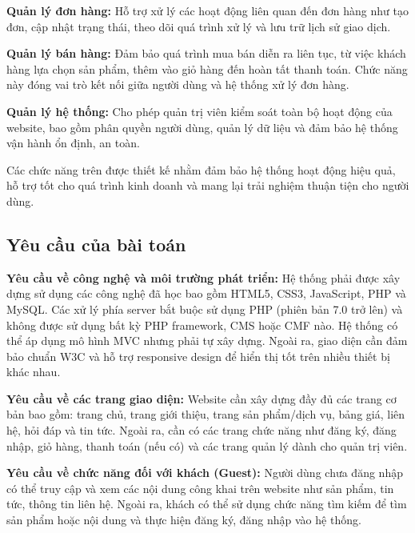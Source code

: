 \documentclass[pt = 12,a4paper]{article}
\begin{document}
\hspace{0.4cm} \textbf{Quản lý đơn hàng:} Hỗ trợ xử lý các hoạt động liên quan đến đơn hàng như tạo đơn, cập nhật trạng thái, theo dõi quá trình xử lý và lưu trữ lịch sử giao dịch.

\hspace{0.4cm} \textbf{Quản lý bán hàng:} Đảm bảo quá trình mua bán diễn ra liên tục, từ việc khách hàng lựa chọn sản phẩm, thêm vào giỏ hàng đến hoàn tất thanh toán. Chức năng này đóng vai trò kết nối giữa người dùng và hệ thống xử lý đơn hàng.

\hspace{0.4cm} \textbf{Quản lý hệ thống:} Cho phép quản trị viên kiểm soát toàn bộ hoạt động của website, bao gồm phân quyền người dùng, quản lý dữ liệu và đảm bảo hệ thống vận hành ổn định, an toàn.

\hspace{0.4cm} Các chức năng trên được thiết kế nhằm đảm bảo hệ thống hoạt động hiệu quả, hỗ trợ tốt cho quá trình kinh doanh và mang lại trải nghiệm thuận tiện cho người dùng.

\subsection{Yêu cầu của bài toán}

\hspace{0.4cm} \textbf{Yêu cầu về công nghệ và môi trường phát triển:} Hệ thống phải được xây dựng sử dụng các công nghệ đã học bao gồm HTML5, CSS3, JavaScript, PHP và MySQL. Các xử lý phía server bắt buộc sử dụng PHP (phiên bản 7.0 trở lên) và không được sử dụng bất kỳ PHP framework, CMS hoặc CMF nào. Hệ thống có thể áp dụng mô hình MVC nhưng phải tự xây dựng. Ngoài ra, giao diện cần đảm bảo chuẩn W3C và hỗ trợ responsive design để hiển thị tốt trên nhiều thiết bị khác nhau.

\hspace{0.4cm} \textbf{Yêu cầu về các trang giao diện:} Website cần xây dựng đầy đủ các trang cơ bản bao gồm: trang chủ, trang giới thiệu, trang sản phẩm/dịch vụ, bảng giá, liên hệ, hỏi đáp và tin tức. Ngoài ra, cần có các trang chức năng như đăng ký, đăng nhập, giỏ hàng, thanh toán (nếu có) và các trang quản lý dành cho quản trị viên.

\hspace{0.4cm} \textbf{Yêu cầu về chức năng đối với khách (Guest):} Người dùng chưa đăng nhập có thể truy cập và xem các nội dung công khai trên website như sản phẩm, tin tức, thông tin liên hệ. Ngoài ra, khách có thể sử dụng chức năng tìm kiếm để tìm sản phẩm hoặc nội dung và thực hiện đăng ký, đăng nhập vào hệ thống.
\end{document}
